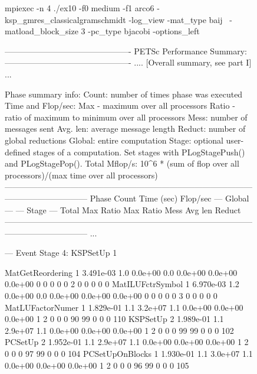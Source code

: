 \begin{figure}[tb]
  \begin{outputlisting}[\tiny\ttfamily]
mpiexec -n 4 ./ex10 -f0 medium -f1 arco6 -ksp_gmres_classicalgramschmidt -log_view -mat_type baij \
            -matload_block_size 3 -pc_type bjacobi -options_left

---------------------------------------------- PETSc Performance Summary: ----------------------------------------------
.... [Overall summary, see part I] ...

Phase summary info:
   Count: number of times phase was executed
   Time and Flop/sec: Max - maximum over all processors
                       Ratio - ratio of maximum to minimum over all processors
   Mess: number of messages sent
   Avg. len: average message length
   Reduct: number of global reductions
   Global: entire computation
   Stage: optional user-defined stages of a computation. Set stages with PLogStagePush() and PLogStagePop().
   Total Mflop/s: 10^6 * (sum of flop over all processors)/(max time over all processors)
------------------------------------------------------------------------------------------------------------------------
Phase              Count      Time (sec)       Flop/sec                           --- Global ---  --- Stage ---   Total
                            Max    Ratio      Max    Ratio  Mess  Avg len  Reduct %
------------------------------------------------------------------------------------------------------------------------
...

--- Event Stage 4: KSPSetUp 1

MatGetReordering       1  3.491e-03   1.0  0.0e+00   0.0  0.0e+00 0.0e+00 0.0e+00  0  0  0  0  0   2  0  0  0  0     0
MatILUFctrSymbol       1  6.970e-03   1.2  0.0e+00   0.0  0.0e+00 0.0e+00 0.0e+00  0  0  0  0  0   3  0  0  0  0     0
MatLUFactorNumer       1  1.829e-01   1.1  3.2e+07   1.1  0.0e+00 0.0e+00 0.0e+00  1  2  0  0  0  90 99  0  0  0   110
KSPSetUp               2  1.989e-01   1.1  2.9e+07   1.1  0.0e+00 0.0e+00 0.0e+00  1  2  0  0  0  99 99  0  0  0   102
PCSetUp                2  1.952e-01   1.1  2.9e+07   1.1  0.0e+00 0.0e+00 0.0e+00  1  2  0  0  0  97 99  0  0  0   104
PCSetUpOnBlocks        1  1.930e-01   1.1  3.0e+07   1.1  0.0e+00 0.0e+00 0.0e+00  1  2  0  0  0  96 99  0  0  0   105


\end{outputlisting}
\end{figure}
